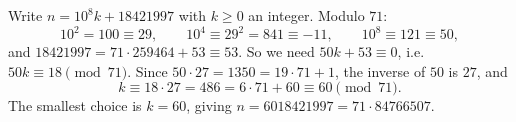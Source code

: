 Write $n=10^8k+18421997$ with $k\ge0$ an integer. Modulo $71$:
\[10^2=100\equiv29,\qquad10^4\equiv29^2=841\equiv-11,\qquad10^8\equiv121\equiv50,\]
and $18421997=71\cdot259464+53\equiv53$. So we need $50k+53\equiv0$, i.e. $50k\equiv18\pmod{71}$. Since $50\cdot27=1350=19\cdot71+1$, the inverse of $50$ is $27$, and
\[k\equiv18\cdot27=486=6\cdot71+60\equiv60\pmod{71}.\]
The smallest choice is $k=60$, giving $n=\boxed{6018421997}=71\cdot84766507$.
